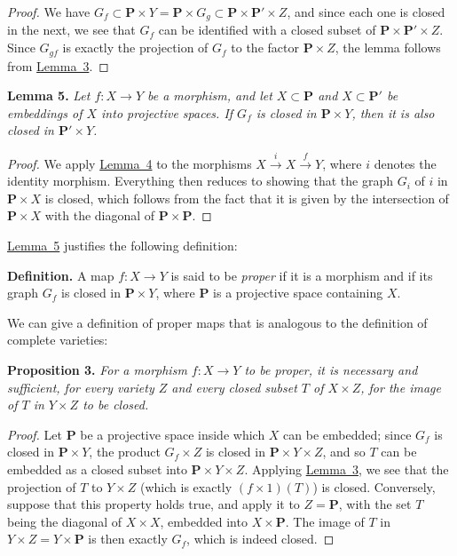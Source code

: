 \documentclass{article}
\newenvironment{itenv}[1]
  {\phantomsection\par\medskip\noindent\textbf{#1.}\itshape}
  {\medskip}
\newenvironment{rmenv}[1]
  {\phantomsection\par\medskip\noindent\textbf{#1.}\rmfamily}
  {\medskip}
\newcommand{\PP}{\mathbf{P}}
\newcommand{\oldpage}[1]{\marginpar{\footnotesize$\Big\vert$ \textit{p.~#1}}}
\begin{document}
\begin{proof}
  We have $G_f \subset \PP\times Y = \PP\times G_g \subset \PP\times \PP'\times Z$, and since each one is closed in the next, we see that $G_f$ can be identified with a closed subset of $\PP\times \PP'\times Z$.
  Since $G_{gf}$ is exactly the projection of $G_f$ to the factor $\PP\times Z$, the lemma follows from \hyperref[lemma3]{Lemma~3}.
\end{proof}

\begin{itenv}{Lemma 5}
\label{lemma5}
  Let $f\colon X\to Y$ be a morphism, and let $X\subset \PP$ and $X\subset \PP'$ be embeddings of $X$ into projective spaces.
  If $G_f$ is closed in $\PP\times Y$, then it is also closed in $\PP'\times Y$.
\end{itenv}

\begin{proof}
  We apply \hyperref[lemma4]{Lemma~4} to the morphisms $X\xrightarrow{i}X\xrightarrow{f}Y$, where $i$ denotes the identity morphism.
  Everything then reduces to showing that the graph $G_i$ of $i$ in $\PP\times X$ is closed, which follows from the fact that it is given by the intersection of $\PP\times X$ with the diagonal of $\PP\times \PP$.
\end{proof}

\hyperref[lemma5]{Lemma~5} justifies the following definition:

\begin{rmenv}{Definition}
  A map $f\colon X\to Y$ is said to be \emph{proper} if it is a morphism and if its graph $G_f$ is closed in $\PP\times Y$, where $\PP$ is a projective space containing $X$.
\end{rmenv}

We can give a definition of proper maps that is analogous to the definition of complete varieties:

\begin{itenv}{Proposition 3}
\label{proposition3}
  For a morphism $f\colon X\to Y$ to be proper, it is necessary and sufficient, for every variety $Z$ and every closed subset $T$ of $X\times Z$, for the image of $T$ in $Y\times Z$ to be closed.
\end{itenv}

\begin{proof}
  Let $\PP$ be a projective space inside which $X$ can be embedded;
  since $G_f$ is closed in $\PP\times Y$, the product $G_f\times Z$ is closed in $\PP\times Y\times Z$, and so $T$ can be embedded as a closed subset into $\PP\times Y\times Z$.
\oldpage{101}
  Applying \hyperref[lemma3]{Lemma~3}, we see that the projection of $T$ to $Y\times Z$ (which is exactly $(f\times1)(T)$) is closed.
  Conversely, suppose that this property holds true, and apply it to $Z=\PP$, with the set $T$ being the diagonal of $X\times X$, embedded into $X\times \PP$.
  The image of $T$ in $Y\times Z=Y\times \PP$ is then exactly $G_f$, which is indeed closed.
\end{proof}
\end{document}
